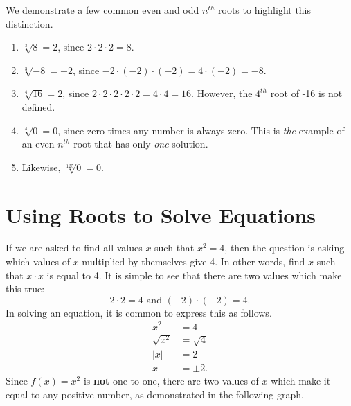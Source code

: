 \documentclass{ximera}
\begin{document}
\begin{example}
We demonstrate a few common even and odd $n^{th}$ roots to highlight this distinction.
\begin{enumerate}
\item $\sqrt[3]{8} = 2$, since $2 \cdot 2 \cdot 2 = 8$.

\item $\sqrt[3]{-8} = - 2$, since $-2 \cdot (-2) \cdot (-2) = 4 \cdot (-2) = -8$.

\item $\sqrt[4]{16} = 2$, since $2 \cdot 2 \cdot 2 \cdot 2 \cdot 2 = 4 \cdot 4 = 16$. However, the $4^{th}$ root of -16 is not defined.

\item $\sqrt[4]{0} =0$, since zero times any number is always zero. This is {\em the} example of an even $n^{th}$ root that has only {\em one} solution.

\item Likewise, $\sqrt[125]{0} = 0$.
\end{enumerate}
\end{example}

\section{Using Roots to Solve Equations}
If we are asked to find all values $x$ such that $x^2=4$, then the question is asking which values of $x$ multiplied by themselves give 4. In other words, find $x$ such that $x \cdot x$ is equal to 4. It is simple to see that there are two values which make this true:
$$2\cdot 2 = 4 \text{ and } (-2) \cdot (-2) = 4.$$
In solving an equation, it is common to express this as follows.
\begin{align*}
x^2 &= 4 \\
\sqrt{x^2} &= \sqrt{4} \\
|x| &= 2 \\
x &= \pm 2.
\end{align*}
Since $f(x)=x^2$ is \textbf{not} one-to-one, there are two values of $x$ which make it equal to any positive number, as demonstrated in the following graph.
\end{document}
